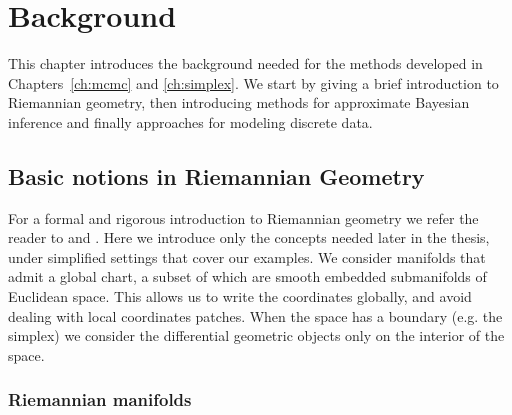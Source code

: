 \chapter{Background} \label{ch:background}



This chapter introduces the background needed for the methods developed in Chapters~\ref{ch:mcmc} and \ref{ch:simplex}.  We start by giving a brief introduction to Riemannian geometry, then introducing methods for approximate Bayesian inference and finally approaches for modeling discrete data. 

\section{Basic notions in Riemannian Geometry} \label{sec:riemannian_background}
For a formal and rigorous introduction to Riemannian geometry we refer the reader to \citet{do1992riemannian} and \citet{Lee2018}. Here we introduce only the concepts needed later in the thesis, under simplified settings that cover our examples. We consider manifolds that admit a global chart, a subset of which are  smooth embedded submanifolds of Euclidean space. This allows us to write the coordinates globally, and avoid dealing with local coordinates patches. When the space has a boundary (e.g. the simplex) we consider the differential geometric objects only on the interior of the space. 

\subsection{Riemannian manifolds}

